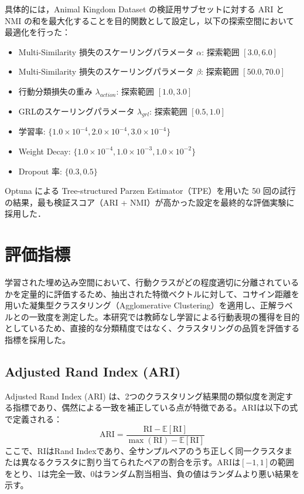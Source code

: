 具体的には，Animal Kingdom Dataset の検証用サブセットに対する ARI と NMI の和を最大化することを目的関数として設定し，以下の探索空間において最適化を行った：

\begin{itemize}
  \item Multi-Similarity 損失のスケーリングパラメータ $\alpha$: 探索範囲 $[3.0, 6.0]$
  \item Multi-Similarity 損失のスケーリングパラメータ $\beta$: 探索範囲 $[50.0, 70.0]$
  \item 行動分類損失の重み $\lambda_{action}$: 探索範囲 $[1.0, 3.0]$
  \item GRLのスケーリングパラメータ $\lambda_{grl}$: 探索範囲 $[0.5, 1.0]$
  \item 学習率: $\{1.0 \times 10^{-4}, 2.0 \times 10^{-4}, 3.0 \times 10^{-4}\}$
  \item Weight Decay: $\{1.0 \times 10^{-4}, 1.0 \times 10^{-3}, 1.0 \times 10^{-2}\}$
  \item Dropout 率: $\{0.3, 0.5\}$
\end{itemize}

Optuna による Tree-structured Parzen Estimator（TPE）を用いた 50 回の試行の結果，最も検証スコア（ARI + NMI）が高かった設定を最終的な評価実験に採用した．

\section{評価指標}
学習された埋め込み空間において、行動クラスがどの程度適切に分離されているかを定量的に評価するため、抽出された特徴ベクトルに対して、コサイン距離を用いた凝集型クラスタリング（Agglomerative Clustering）を適用し、正解ラベルとの一致度を測定した。本研究では教師なし学習による行動表現の獲得を目的としているため、直接的な分類精度ではなく、クラスタリングの品質を評価する指標を採用した。

\subsection{Adjusted Rand Index (ARI)}
Adjusted Rand Index (ARI) は、2つのクラスタリング結果間の類似度を測定する指標であり、偶然による一致を補正している点が特徴である。ARIは以下の式で定義される：
\begin{equation}
  \mathrm{ARI} = \frac{\mathrm{RI} - \mathbb{E}[\mathrm{RI}]}{\max(\mathrm{RI}) - \mathbb{E}[\mathrm{RI}]}
\end{equation}
ここで、$\mathrm{RI}$はRand Indexであり、全サンプルペアのうち正しく同一クラスタまたは異なるクラスタに割り当てられたペアの割合を示す。ARIは$[-1, 1]$の範囲をとり、1は完全一致、0はランダム割当相当、負の値はランダムより悪い結果を示す。

